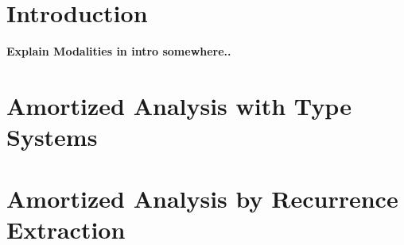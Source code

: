\documentclass[draft]{westhesis}
\title{ }
\author{ }
\begin{document}
\mainmatter

\chapter{Introduction}


\textbf{Explain Modalities in intro somewhere..}

\chapter{Amortized Analysis with Type Systems}
\label{chap:lambda-amor}



\chapter{Amortized Analysis by Recurrence Extraction}
\label{chap:rec-extr}




\end{document}
